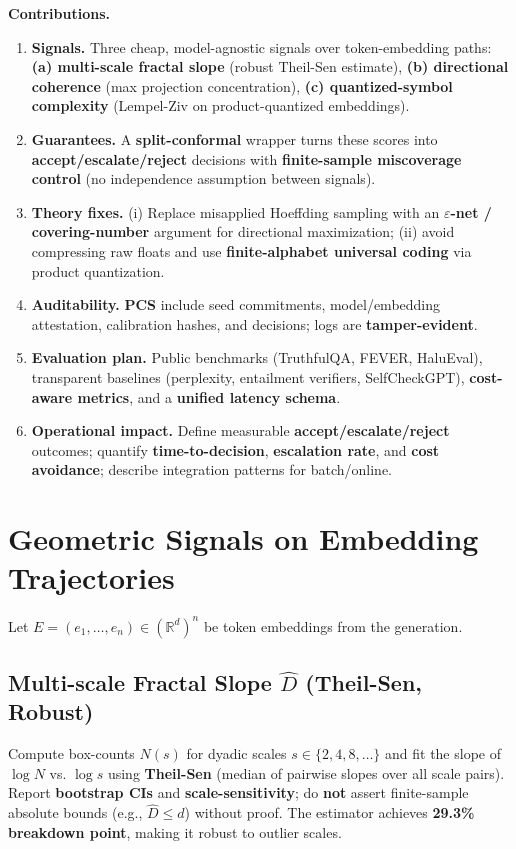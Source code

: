 \documentclass[10pt]{article}
\begin{document}
\textbf{Contributions.}
\begin{enumerate}
\item \textbf{Signals.} Three cheap, model-agnostic signals over token-embedding paths: \textbf{(a) multi-scale fractal slope} (robust Theil-Sen estimate), \textbf{(b) directional coherence} (max projection concentration), \textbf{(c) quantized-symbol complexity} (Lempel-Ziv on product-quantized embeddings).
\item \textbf{Guarantees.} A \textbf{split-conformal} wrapper turns these scores into \textbf{accept/escalate/reject} decisions with \textbf{finite-sample miscoverage control} (no independence assumption between signals).
\item \textbf{Theory fixes.} (i) Replace misapplied Hoeffding sampling with an \textbf{$\varepsilon$-net / covering-number} argument for directional maximization; (ii) avoid compressing raw floats and use \textbf{finite-alphabet universal coding} via product quantization.
\item \textbf{Auditability.} \textbf{PCS} include seed commitments, model/embedding attestation, calibration hashes, and decisions; logs are \textbf{tamper-evident}.
\item \textbf{Evaluation plan.} Public benchmarks (TruthfulQA, FEVER, HaluEval), transparent baselines (perplexity, entailment verifiers, SelfCheckGPT), \textbf{cost-aware metrics}, and a \textbf{unified latency schema}.
\item \textbf{Operational impact.} Define measurable \textbf{accept/escalate/reject} outcomes; quantify \textbf{time-to-decision}, \textbf{escalation rate}, and \textbf{cost avoidance}; describe integration patterns for batch/online.
\end{enumerate}

\section{Geometric Signals on Embedding Trajectories}
\label{sec:signals}

Let $E=(e_1,\dots,e_n)\in(\mathbb{R}^d)^n$ be token embeddings from the generation.

\subsection{Multi-scale Fractal Slope $\hat{D}$ (Theil-Sen, Robust)}
\label{sec:signal-dhat}

Compute box-counts $N(s)$ for dyadic scales $s\in\{2,4,8,\dots\}$ and fit the slope of $\log N$ vs. $\log s$ using \textbf{Theil-Sen} (median of pairwise slopes over all scale pairs). Report \textbf{bootstrap CIs} and \textbf{scale-sensitivity}; do \textbf{not} assert finite-sample absolute bounds (e.g., $\hat{D}\le d$) without proof. The estimator achieves \textbf{29.3\% breakdown point}, making it robust to outlier scales.
\end{document}
